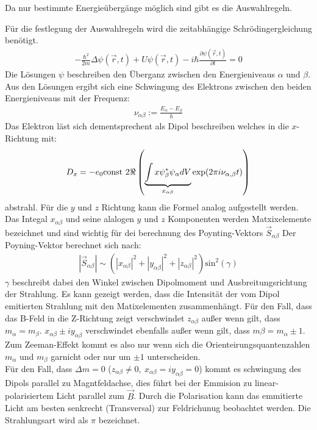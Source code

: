 Da nur bestimmte Energieübergänge möglich sind gibt es die Auswahlregeln.

Für die festlegung der Auswahlregeln wird die zeitabhängige Schrödingergleichung benötigt.
\begin{align}
	-\frac{\hbar^2}{2m}\Delta \psi(\vec{r},t)+U\psi(\vec{r},t)-i\hbar\frac{\partial \psi(\vec{r},t)}{\partial t}=0
\end{align}
Die Lösungen $\psi$ beschreiben den Überganz zwischen den Energieniveaus $\alpha$ und $\beta$.
Aus den Lösungen ergibt sich eine Schwingung des Elektrons zwischen den beiden Energieniveaus mit der Frequenz:
\begin{align*}
  \nu_{\alpha\beta}:=\frac{E_\alpha-E_\beta}{h}
\end{align*}
Das Elektron läst sich dementsprechent als Dipol beschreiben welches in die $x$-Richtung mit:
\begin{align*}
  	D_x=-e_0\text{const } 2 \Re \real\left( \underbrace{\int x\psi^*_\beta\psi_\alpha dV}_{x_{\alpha\beta}}\exp(2\pi i\nu_{\alpha,\beta}t) \right)
\end{align*}
abstrahl.
Für die $y$ und $z$ Richtung kann die Formel analog aufgestellt werden.
Das Integal $x_{\alpha\beta}$ und seine alalogen $y$ und $z$ Komponenten werden Matxixelemente bezeichnet und sind wichtig für dei berechnung des Poynting-Vektors $\vec{S}_{\alpha\beta}$
Der Poyning-Vektor berechnet sich nach:
\begin{align*}
  |\vec{S}_{\alpha\beta}| \sim \left(|x_{\alpha\beta}|^2+|y_{\alpha\beta}|^2+|z_{\alpha\beta}|^2\right) \text{sin}^2(\gamma)
\end{align*}
$\gamma$ beschreibt dabei den Winkel zwischen Dipolmoment und Ausbreitungsrichtung der Strahlung.
Es kann gezeigt werden, dass die Intensität der vom Dipol emitierten Strahlung mit den Matixelementen zusammenhängt.
Für den Fall, dass das B-Feld in die Z-Richtung zeigt verschwindet $z_{\alpha\beta}$ außer wenn gilt, dass $m_{\alpha} = m_{\beta}$.
$x_{\alpha\beta}\pm i y_{\alpha\beta}$ verschwindet ebenfalls außer wenn gilt, dass $m{\beta} = m_{\alpha} \pm 1$.
Zum Zeeman-Effekt kommt es also nur wenn sich die Orienteirungsquantenzahlen $m_{\alpha}$ und $m_{\beta}$ garnicht oder nur um $\pm 1$ unterscheiden.\\

Für den Fall, dass $\Delta m = 0$ ($z_{\alpha\beta} \neq 0,\ x_{\alpha\beta} = i y_{\alpha\beta} = 0$) kommt es schwingung des Dipols parallel zu Magntfeldachse,
dies führt bei der Emmision zu linear-polarisiertem Licht parallel zum $\vec{B}$.
Durch die Polarisation kann das emmitierte Licht am besten senkrecht (Transversal) zur Feldrichunug beobachtet werden.
Die Strahlungsart wird als $\pi$ bezeichnet.

